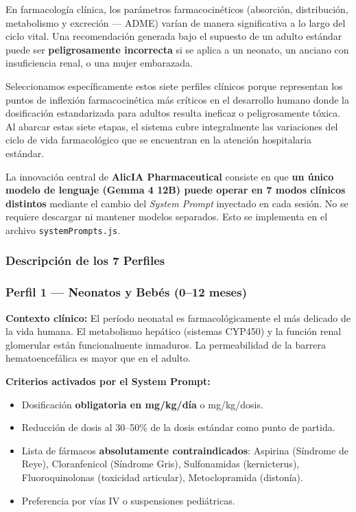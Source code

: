 \documentclass[12pt,a4paper]{article}
\begin{document}
En farmacología clínica, los parámetros farmacocinéticos (absorción, distribución, metabolismo y
excreción --- ADME) varían de manera significativa a lo largo del ciclo vital. Una recomendación
generada bajo el supuesto de un adulto estándar puede ser \textbf{peligrosamente incorrecta} si
se aplica a un neonato, un anciano con insuficiencia renal, o una mujer embarazada.

Seleccionamos específicamente estos siete perfiles clínicos porque representan los puntos de inflexión farmacocinética más críticos en el desarrollo humano donde la dosificación estandarizada para adultos resulta ineficaz o peligrosamente tóxica. Al abarcar estas siete etapas, el sistema cubre integralmente las variaciones del ciclo de vida farmacológico que se encuentran en la atención hospitalaria estándar.

La innovación central de \textbf{AlicIA Pharmaceutical} consiste en que \textbf{un único modelo
de lenguaje (Gemma 4 12B) puede operar en 7 modos clínicos distintos} mediante el cambio del
\textit{System Prompt} inyectado en cada sesión. No se requiere descargar ni mantener modelos
separados. Esto se implementa en el archivo \texttt{systemPrompts.js}.

\subsubsection{Descripción de los 7 Perfiles}

\subsubsection{Perfil 1 --- Neonatos y Bebés (0--12 meses)}

\begin{tcolorbox}[colback=neonato!5, colframe=neonato, title=\textbf{Neonatos y Bebés --- 0-12 meses}]
  \textbf{Contexto clínico:} El período neonatal es farmacológicamente el más delicado de la vida
  humana. El metabolismo hepático (sistemas CYP450) y la función renal glomerular están
  funcionalmente inmaduros. La permeabilidad de la barrera hematoencefálica es mayor que en el
  adulto.

  \medskip\textbf{Criterios activados por el System Prompt:}
  \begin{itemize}
    \item Dosificación \textbf{obligatoria en mg/kg/día} o mg/kg/dosis.
    \item Reducción de dosis al 30--50\% de la dosis estándar como punto de partida.
    \item Lista de fármacos \textbf{absolutamente contraindicados}: Aspirina (Síndrome de Reye),
      Cloranfenicol (Síndrome Gris), Sulfonamidas (kernicterus), Fluoroquinolonas (toxicidad
      articular), Metoclopramida (distonía).
    \item Preferencia por vías IV o suspensiones pediátricas.
  \end{itemize}
\end{tcolorbox}
\end{document}
